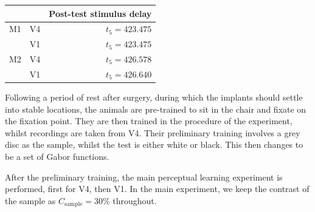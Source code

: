 \begin{table}[hbtp]
\begin{center}
\begin{tabular}{ccr}
\midrule
        &           & Post-test stimulus delay \\
\midrule
M1      & V4        & $t_5 = 423.475$ \\
        & V1        & $t_5 = 423.475$ \\
M2      & V4        & $t_5 = 426.578$ \\
        & V1        & $t_5 = 426.640$ \\
\bottomrule
%
%
\end{tabular}
\end{center}
\end{table}

Following a period of rest after surgery, during which the implants should settle into stable locations, the animals are pre-trained to sit in the chair and fixate on the fixation point.
They are then trained in the procedure of the experiment, whilst recordings are taken from \ac{V4}.
Their preliminary training involves a grey disc as the sample, whilst the test is either white or black.
This then changes to be a set of Gabor functions.


After the preliminary training, the main perceptual learning experiment is performed, first for \ac{V4}, then \ac{V1}.
In the main experiment, we keep the contrast of the sample as $C_\text{sample} = 30\%$ throughout.

